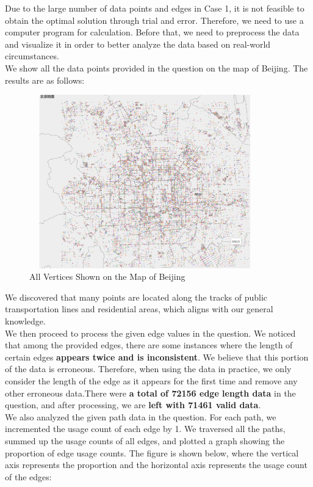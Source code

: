\indent\indent Due to the large number of data points and edges in Case 1, it is not feasible to obtain the optimal solution through trial and error. Therefore, we need to use a computer program for calculation. Before that, we need to preprocess the data and visualize it in order to better analyze the data based on real-world circumstances.\\
\indent We show all the data points provided in the question on the map of Beijing. The results are as follows:
\begin{figure}[H]%
    \centering
    \includegraphics[width=10cm,height=7.5cm]{北京地图初始版.png}
    \caption{All Vertices Shown on the Map of Beijing}
\end{figure}
\indent We discovered that many points are located along the tracks of public transportation lines and residential areas, which aligns with our general knowledge.\\
\indent We then proceed to process the given edge values in the question. We noticed that among the provided edges, there are some instances where the length of certain edges \textbf{appears twice and is inconsistent}. We believe that this portion of the data is erroneous. Therefore, when using the data in practice, we only consider the length of the edge as it appears for the first time and remove any other erroneous data.There were \textbf{a total of 72156 edge length data} in the question, and after processing, we are \textbf{left with 71461 valid data}.\\
\indent We also analyzed the given path data in the question. For each path, we incremented the usage count of each edge by 1. We traversed all the paths, summed up the usage counts of all edges, and plotted a graph showing the proportion of edge usage counts. The figure is shown below, where the vertical axis represents the proportion and the horizontal axis represents the usage count of the edges:
